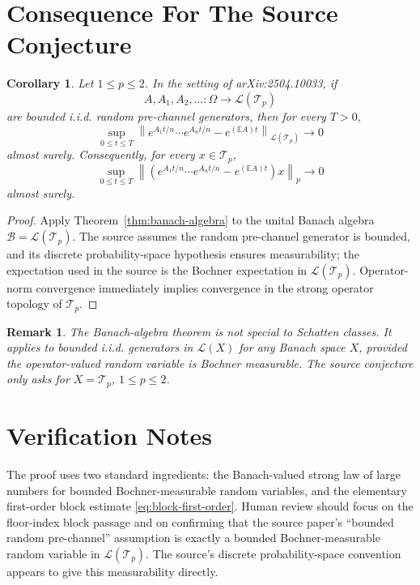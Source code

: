 \documentclass[11pt]{article}
\newtheorem{corollary}{Corollary}
\newtheorem{remark}{Remark}
\newcommand{\E}{\mathbb E}
\newcommand{\calT}{\mathcal T}
\newcommand{\calL}{\mathcal L}
\newcommand{\calB}{\mathcal B}
\begin{document}
\section*{Consequence For The Source Conjecture}

\begin{corollary}\label{cor:schatten}
Let \(1\le p\le2\).  In the setting of arXiv:2504.10033, if
\[
  A,A_1,A_2,\ldots:\Omega\to\calL(\calT_p)
\]
are bounded i.i.d. random pre-channel generators, then for every \(T>0\),
\[
  \sup_{0\le t\le T}
  \left\|
    e^{A_1t/n}\cdots e^{A_nt/n}-e^{(\E A)t}
  \right\|_{\calL(\calT_p)}
  \longrightarrow0
\]
almost surely.  Consequently, for every \(x\in\calT_p\),
\[
  \sup_{0\le t\le T}
  \left\|
    \left(e^{A_1t/n}\cdots e^{A_nt/n}-e^{(\E A)t}\right)x
  \right\|_p
  \longrightarrow0
\]
almost surely.
\end{corollary}

\begin{proof}
Apply Theorem~\ref{thm:banach-algebra} to the unital Banach algebra
\(\calB=\calL(\calT_p)\).  The source assumes the random pre-channel generator is bounded, and its discrete probability-space hypothesis ensures measurability; the expectation used in the source is the Bochner expectation in \(\calL(\calT_p)\).  Operator-norm convergence immediately implies convergence in the strong operator topology of \(\calT_p\).
\end{proof}

\begin{remark}
The Banach-algebra theorem is not special to Schatten classes.  It applies to bounded i.i.d. generators in \(\calL(X)\) for any Banach space \(X\), provided the operator-valued random variable is Bochner measurable.  The source conjecture only asks for \(X=\calT_p\), \(1\le p\le2\).
\end{remark}

\section*{Verification Notes}

The proof uses two standard ingredients: the Banach-valued strong law of large numbers for bounded Bochner-measurable random variables, and the elementary first-order block estimate \eqref{eq:block-first-order}.  Human review should focus on the floor-index block passage and on confirming that the source paper's ``bounded random pre-channel'' assumption is exactly a bounded Bochner-measurable random variable in \(\calL(\calT_p)\).  The source's discrete probability-space convention appears to give this measurability directly.
\end{document}
